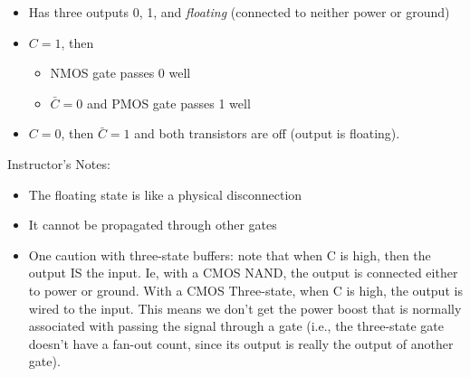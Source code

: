 





\begin{frame}[fragile]
\begin{itemize}
	\item Has three outputs
		0, 1, and {\em floating} (connected to neither power or ground)
	\item $C=1$, then 
	\begin{itemize}
		\item NMOS gate passes 0 well 
		\item $\bar{C}=0$ and PMOS gate passes 1 well
	\end{itemize}
	\item $C=0$, then $\bar{C}=1$ and both transistors are off (output is floating).
\end{itemize}
\end{frame}
\BNotes\ifnum{}
\begin{frame}[fragile]
Instructor's Notes:
\begin{itemize}
\item The floating state is like a physical disconnection
\item It cannot be propagated through other gates
\item One caution with three-state buffers: note that when C is high, then
	the output IS the input.  Ie, with a CMOS NAND, the output is connected
	either to power or ground.  With a CMOS Three-state, when C is high,
	the output is wired to the input.  This means we don't get the power
	boost that is normally associated with passing the signal through a
	gate (i.e., the three-state gate doesn't have a fan-out count, since
	its output is really the output of another gate).
\end{itemize}
\end{frame}
\fi\ENotes



